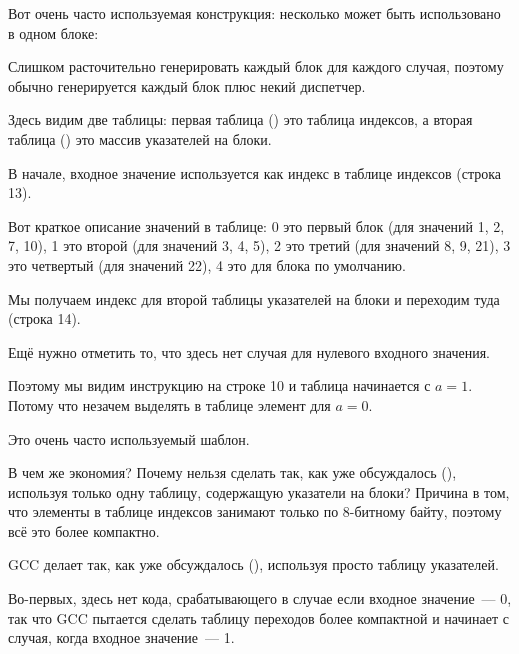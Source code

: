 
Вот очень часто используемая конструкция: несколько  может быть использовано в одном блоке:



Слишком расточительно генерировать каждый блок для каждого случая, поэтому обычно
генерируется каждый блок плюс некий диспетчер.




Здесь видим две таблицы: первая таблица () это таблица индексов,
а вторая таблица () это массив указателей на блоки.

В начале, входное значение используется как индекс в таблице индексов (строка 13). 

Вот краткое описание значений в таблице: 
0 это первый блок  (для значений 1, 2, 7, 10),
1 это второй (для значений 3, 4, 5),
2 это третий (для значений 8, 9, 21),
3 это четвертый (для значений 22),
4 это для блока по умолчанию.

Мы получаем индекс для второй таблицы указателей на блоки и переходим туда (строка 14).

Ещё нужно отметить то, что здесь нет случая для нулевого входного значения.

Поэтому мы видим инструкцию \DEC на строке 10 и таблица начинается с $a=1$.
Потому что незачем выделять в таблице элемент для $a=0$.

Это очень часто используемый шаблон.

В чем же экономия?
Почему нельзя сделать так, как уже обсуждалось (), используя только одну таблицу, содержащую указатели на блоки?
Причина в том, что элементы в таблице индексов занимают только по 8-битному байту, поэтому всё это более компактно.


GCC делает так, как уже обсуждалось (), используя просто таблицу указателей.


Во-первых, здесь нет кода, срабатывающего в случае если входное значение~--- 0, так что GCC пытается
сделать таблицу переходов более компактной и начинает с случая, когда входное значение~--- 1.

